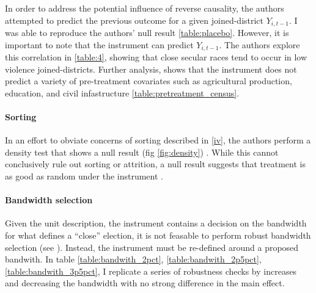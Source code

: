 \documentclass{scrartcl}
\begin{document}
In order to address the potential influence of reverse causality, the authors attempted to predict the previous outcome for a given joined-district $Y_{i,t-1}$.
I was able to reproduce the authors' null result \ref{table:placebo}.
However, it is important to note that the instrument can predict $Y_{i,t-1}$.
The authors explore this correlation in \ref{table:4}, showing that close secular races tend to occur in low violence joined-districts.
Further analysis, shows that the instrument does not predict a variety of pre-treatment covariates such as agricultural production, education, and civil infastructure \ref{table:pretreatment_census}.

\paragraph{Sorting}


In an effort to obviate concerns of sorting described in \ref{iv}, the authors perform a density test that shows a null result (fig \ref{fig:density}) \cite{mccrary_2008}.
While this cannot conclusively rule out sorting or attrition, a null result suggests that treatment is as good as random under the instrument \cite{Cataneo_2019}. 

\paragraph{Bandwidth selection}
Given the unit description, the instrument contains a decision on the bandwidth for what defines a ``close'' election,
it is not feasable to perform robust bandwidth selection (see \cite{Cataneo_2019}).
Instead, the instrument must be re-defined around a proposed bandwith.
In table \ref{table:bandwith_2pct}, \ref{table:bandwith_2p5pct}, \ref{table:bandwith_3p5pct}, I replicate a series of robustness checks by increases and decreasing the bandwidth with no strong difference in the main effect. 


\end{document}
